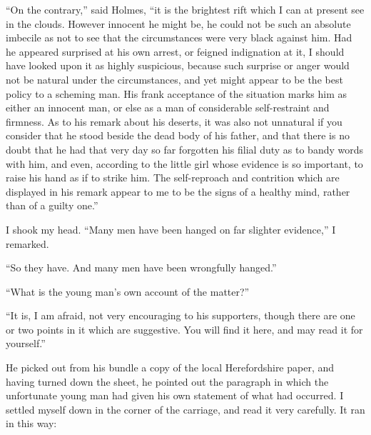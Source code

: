 “On the contrary,” said Holmes, “it is the brightest rift
which I can at present see in the clouds. However innocent
he might be, he could not be such an absolute imbecile as
not to see that the circumstances were very black against him.
Had he appeared surprised at his own arrest, or feigned indignation
at it, I should have looked upon it as highly suspicious,
because such surprise or anger would not be natural
under the circumstances, and yet might appear to be the best
policy to a scheming man. His frank acceptance of the situation
marks him as either an innocent man, or else as a man
of considerable self-restraint and firmness. As to his remark
about his deserts, it was also not unnatural if you consider
that he stood beside the dead body of his father, and that
there is no doubt that he had that very day so far forgotten
his filial duty as to bandy words with him, and even, according
to the little girl whose evidence is so important, to raise
his hand as if to strike him. The self-reproach and contrition
which are displayed in his remark appear to me to be the
signs of a healthy mind, rather than of a guilty one.”

I shook my head. “Many men have been hanged on far
slighter evidence,” I remarked.

“So they have. And many men have been wrongfully
hanged.”

“What is the young man’s own account of the matter?”

“It is, I am afraid, not very encouraging to his supporters,
though there are one or two points in it which are suggestive.
You will find it here, and may read it for yourself.”

He picked out from his bundle a copy of the local Herefordshire
paper, and having turned down the sheet, he pointed
out the paragraph in which the unfortunate young man
had given his own statement of what had occurred. I settled
myself down in the corner of the carriage, and read it
very carefully. It ran in this way:

